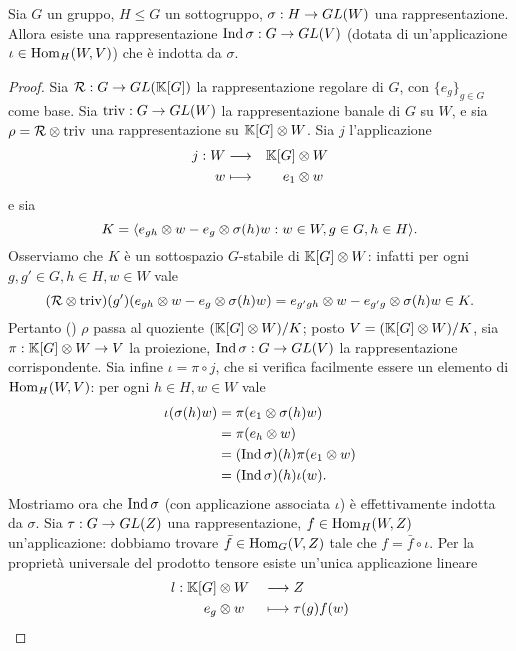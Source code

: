 \begin{proposition}
Sia $G$ un gruppo, $H\le G$ un sottogruppo, $\sigma:H\to GL(W)$ una rappresentazione. Allora esiste una rappresentazione $\operatorname{Ind}\sigma:G\to GL(V)$ (dotata di un'applicazione $\iota\in\operatorname{Hom}_H(W,V)$) che è indotta da $\sigma$.
\end{proposition}
\begin{proof}
Sia $\mathcal{R}:G\to GL(\mathbb{K}[G])$ la rappresentazione regolare di $G$, con $\{e_g\}_{g\in G}$ come base. Sia $\operatorname{triv}:G\to GL(W)$ la rappresentazione banale di $G$ su $W$, e sia $\rho=\mathcal{R}\otimes\operatorname{triv}$ una rappresentazione su $\mathbb{K}[G]\otimes W$. Sia $j$ l'applicazione
\begin{alignat*}{2}
j:W&\longrightarrow&\mathbb{K}[G]&\otimes W\\
w&\longmapsto&e_1&\otimes w
\end{alignat*}
e sia
$$
K=\langle e_{gh}\otimes w-e_g\otimes\sigma(h)w:w\in W,g\in G,h\in H\rangle.
$$
Osserviamo che $K$ è un sottospazio $G$-stabile di $\mathbb{K}[G]\otimes W$: infatti per ogni $g,g'\in G\comma h\in H\comma w\in W$ vale
$$
(\mathcal{R}\otimes\operatorname{triv})(g')(e_{gh}\otimes w-e_g\otimes\sigma(h)w)=e_{g'gh}\otimes w-e_{g'g}\otimes\sigma(h)w\in K.
$$
Pertanto () $\rho$ passa al quoziente $(\mathbb{K}[G]\otimes W)/K$; posto $V=(\mathbb{K}[G]\otimes W)/K$, sia $\pi:\mathbb{K}[G]\otimes W\to V$ la proiezione, $\operatorname{Ind}\sigma:G\to GL(V)$ la rappresentazione corrispondente. Sia infine $\iota=\pi\circ j$, che si verifica facilmente essere un elemento di $\operatorname{Hom}_H(W,V)$: per ogni $h\in H\comma w\in W$ vale
\begin{align*}
\iota(\sigma(h)w)&=\pi(e_1\otimes\sigma(h)w)\\
&=\pi(e_h\otimes w)\\
&=(\operatorname{Ind}\sigma)(h)\pi(e_1\otimes w)\\
&=(\operatorname{Ind}\sigma)(h)\iota(w).
\end{align*}
Mostriamo ora che $\operatorname{Ind}\sigma$ (con applicazione associata $\iota$) è effettivamente indotta da $\sigma$. Sia $\tau:G\to GL(Z)$ una rappresentazione, $f\in\operatorname{Hom}_H(W,Z)$ un'applicazione: dobbiamo trovare $\bar{f}\in\operatorname{Hom}_G(V,Z)$ tale che $f=\bar{f}\circ\iota$. Per la proprietà universale del prodotto tensore esiste un'unica applicazione lineare
\begin{alignat*}{2}
l:\mathbb{K}[G]&\otimes W&&\longrightarrow Z\\
e_g&\otimes w&&\longmapsto\tau(g)f(w)
\end{alignat*}

\end{proof}
